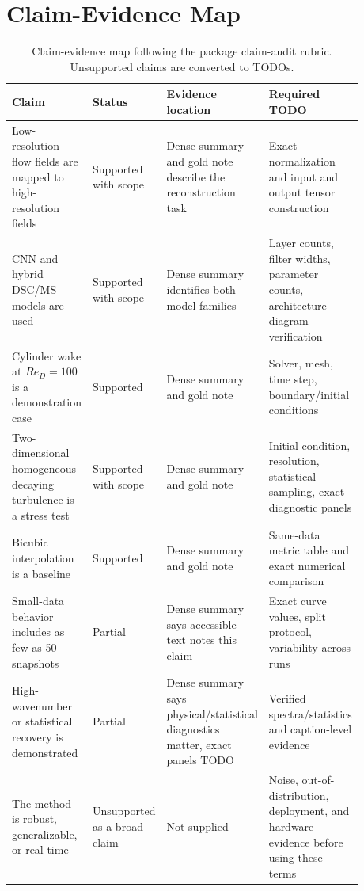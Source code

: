 \documentclass[11pt]{article}
\begin{document}
\section{Claim-Evidence Map}
\begin{table}[h]
\centering
\small
\begin{tabular}{p{0.25\linewidth}p{0.18\linewidth}p{0.25\linewidth}p{0.20\linewidth}}
\toprule
Claim & Status & Evidence location & Required TODO \\
\midrule
Low-resolution flow fields are mapped to high-resolution fields & Supported with scope & Dense summary and gold note describe the reconstruction task & Exact normalization and input and output tensor construction \\
CNN and hybrid DSC/MS models are used & Supported with scope & Dense summary identifies both model families & Layer counts, filter widths, parameter counts, architecture diagram verification \\
Cylinder wake at $Re_D=100$ is a demonstration case & Supported & Dense summary and gold note & Solver, mesh, time step, boundary/initial conditions \\
Two-dimensional homogeneous decaying turbulence is a stress test & Supported with scope & Dense summary and gold note & Initial condition, resolution, statistical sampling, exact diagnostic panels \\
Bicubic interpolation is a baseline & Supported & Dense summary and gold note & Same-data metric table and exact numerical comparison \\
Small-data behavior includes as few as 50 snapshots & Partial & Dense summary says accessible text notes this claim & Exact curve values, split protocol, variability across runs \\
High-wavenumber or statistical recovery is demonstrated & Partial & Dense summary says physical/statistical diagnostics matter, exact panels TODO & Verified spectra/statistics and caption-level evidence \\
The method is robust, generalizable, or real-time & Unsupported as a broad claim & Not supplied & Noise, out-of-distribution, deployment, and hardware evidence before using these terms \\
\bottomrule
\end{tabular}
\caption{Claim-evidence map following the package claim-audit rubric. Unsupported claims are converted to TODOs.}
\label{tab:claims}
\end{table}
\end{document}
